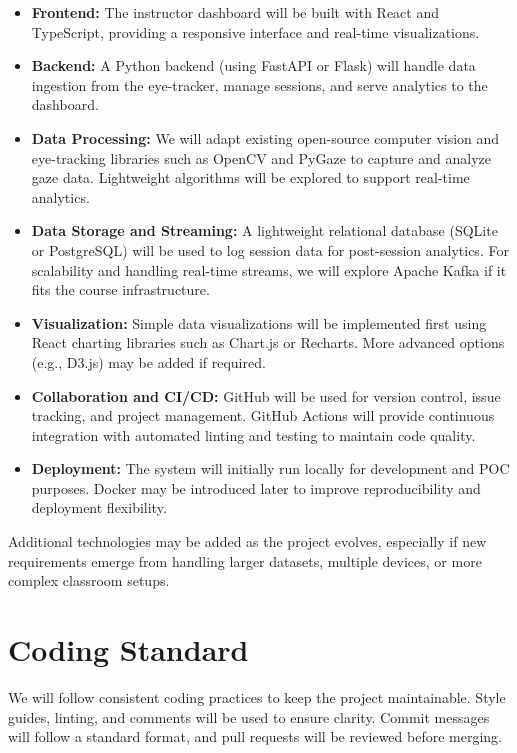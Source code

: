 \documentclass{article}
\begin{document}
\begin{itemize}
  \item \textbf{Frontend:} The instructor dashboard will be built with React and
  TypeScript, providing a responsive interface and real-time visualizations.
  \item \textbf{Backend:} A Python backend (using FastAPI or Flask) will handle
  data ingestion from the eye-tracker, manage sessions, and serve analytics to
  the dashboard.
  \item \textbf{Data Processing:} We will adapt existing open-source
  computer vision and eye-tracking libraries such as OpenCV and PyGaze to
  capture and analyze gaze data. Lightweight algorithms will be explored to
  support real-time analytics.
  \item \textbf{Data Storage and Streaming:} A lightweight relational database
  (SQLite or PostgreSQL) will be used to log session data for post-session
  analytics. For scalability and handling real-time streams, we will explore
  Apache Kafka if it fits the course infrastructure.
  \item \textbf{Visualization:} Simple data visualizations will be implemented
  first using React charting libraries such as Chart.js or Recharts. More
  advanced options (e.g., D3.js) may be added if required.
  \item \textbf{Collaboration and CI/CD:} GitHub will be used for version
  control, issue tracking, and project management. GitHub Actions will provide
  continuous integration with automated linting and testing to maintain code
  quality.
  \item \textbf{Deployment:} The system will initially run locally for
  development and POC purposes. Docker may be introduced later to improve
  reproducibility and deployment flexibility.
\end{itemize}

Additional technologies may be added as the project evolves, especially if new
requirements emerge from handling larger datasets, multiple devices, or more
complex classroom setups.
\section{Coding Standard}

We will follow consistent coding practices to keep the project maintainable.
Style guides, linting, and comments will be used to ensure clarity. Commit
messages will follow a standard format, and pull requests will be reviewed
before merging.
\end{document}
